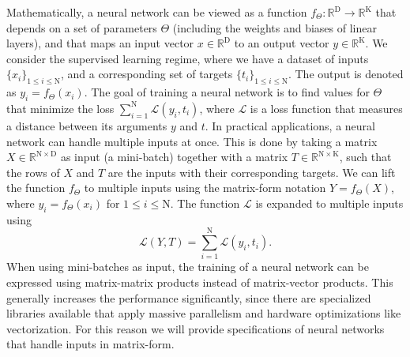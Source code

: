 \documentclass[twoside,11pt]{article}
\newcommand{\const}[1]{\ensuremath{\mathrm{#1}}} %
\newcommand{\set}[1]{\ensuremath{\{ #1 \} }} %
\newcommand{\Reals}{\mathbb{R}}
\begin{document}
Mathematically, a neural network can be viewed as a function $f_\Theta: \Reals^\const{D} \rightarrow \Reals^\const{K}$ that depends on a set of parameters $\Theta$ (including the weights and biases of linear layers), and that maps an input vector $x \in \Reals^\const{D}$ to an output vector $y \in \Reals^\const{K}$. We consider the supervised learning regime, where we have a dataset of inputs $\set{ x_i }_{1 \leq i \leq \const{N}}$, and a corresponding set of targets $\set{t_i}_{1 \leq i \leq \const{N}}$. The output is denoted as $y_i = f_\Theta(x_i)$. The goal of training a neural network is to find values for $\Theta$ that minimize the loss $\sum_{i=1}^{\const{N}} \mathcal{L}(y_i, t_i)$,
where $\mathcal{L}$ is a loss function that measures a distance between its arguments $y$ and $t$. In practical applications, a neural network can handle multiple inputs at once. This is done by taking a matrix $X \in \Reals^{\const{N} \times \const{D}}$ as input (a mini-batch) together with a matrix $T \in \Reals^{\const{N} \times \const{K}}$, such that the rows of $X$ and $T$ are the inputs with their corresponding targets.  We can lift the function $f_\Theta$ to multiple inputs using the matrix-form notation $Y = f_\Theta(X)$, where $y_i = f_\Theta(x_i)$ for $1 \leq i \leq \const{N}$. The function $\mathcal{L}$ is expanded to multiple inputs using
\[
  \mathcal{L}(Y, T) = \sum_{i=1}^\const{N} \mathcal{L}(y_i, t_i).
\]
When using mini-batches as input, the training of a neural network can be expressed using matrix-matrix products instead of matrix-vector products. This generally increases the performance significantly,
since there are specialized libraries available that apply massive parallelism and hardware optimizations like vectorization. For this reason we will provide specifications of neural networks that handle inputs in matrix-form.
\end{document}

